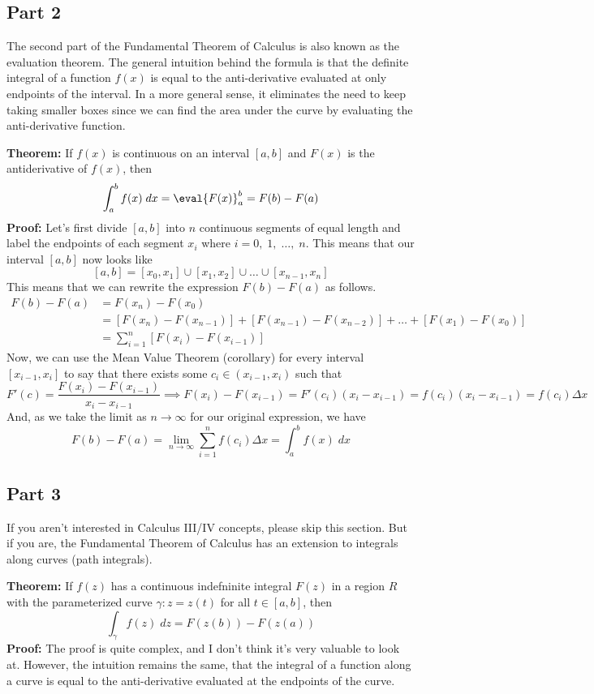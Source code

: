 \subsection{Part 2}
The second part of the Fundamental Theorem of Calculus is also known as the evaluation theorem. The general intuition behind the formula is that the definite integral of a function $f(x)$ is equal to the anti-derivative evaluated at only endpoints of the interval. In a more general sense, it eliminates the need to keep taking smaller boxes since we can find the area under the curve by evaluating the anti-derivative function.
\begin{boxedsection}
  \textbf{Theorem:} If $f(x)$ is continuous on an interval $[a,b]$ and $F(x)$ is the antiderivative of $f(x)$, then
$$
  \int_a^b f(x)\;dx = \eval{F(x)}_a^b = F(b) - F(a)
$$
\textbf{Proof:} Let's first divide $[a,b]$ into $n$ continuous segments of equal length and label the endpoints of each segment $x_i$ where $i = 0,\;1,\;\dots,\;n$. This means that our interval $[a,b]$ now looks like
$$
[a,b] = [x_0,x_1] \cup [x_1,x_2] \cup \dots \cup [x_{n-1},x_n]
$$
This means that we can rewrite the expression $F(b) - F(a)$ as follows.
\begin{align*}
F(b) - F(a) &= F(x_n) - F(x_0)\\
&=  \left[F(x_n) - F(x_{n-1})\right] + \left[F(x_{n-1}) - F(x_{n-2})\right] + \dots + \left[F(x_1) - F(x_0)\right]\\
&= \sum_{i=1}^n \left[F(x_i) - F(x_{i-1})\right]
\end{align*}
Now, we can use the Mean Value Theorem (corollary) for every interval $[x_{i-1}, x_i]$ to say that there exists some $c_i \in (x_{i-1},x_i)$ such that
$$
F'(c) = \frac{F(x_i) - F(x_{i-1})}{x_i - x_{i-1}} \implies F(x_i) - F(x_{i-1}) = F'(c_i)(x_i - x_{i-1}) = f(c_i)(x_i - x_{i-1}) = f(c_i)\Delta x
$$
And, as we take the limit as $n \rightarrow \infty$ for our original expression, we have
$$
F(b) - F(a) = \lim_{n\rightarrow \infty} \sum_{i=1}^n f(c_i) \Delta x = \int_a^b f(x)\;dx 
$$
\end{boxedsection}
\subsection{Part 3}
If you aren't interested in Calculus III/IV concepts, please skip this section. But if you are, the Fundamental Theorem of Calculus has an extension to integrals along curves (path integrals). 
\begin{boxedsection}
  \textbf{Theorem:} If $f(z)$ has a continuous indefninite integral $F(z)$ in a region $R$ with the parameterized curve $\gamma: z = z(t)$ for all $t \in [a,b]$, then
  $$
  \int_\gamma f(z)\;dz = F(z(b)) - F(z(a))
  $$
  \textbf{Proof:} The proof is quite complex, and I don't think it's very valuable to look at. However, the intuition remains the same, that the integral of a function along a curve is equal to the anti-derivative evaluated at the endpoints of the curve.
\end{boxedsection}

